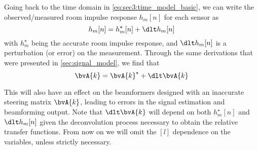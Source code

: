 %	
%	
Going back to the time domain in \cref{eq:sec3:time_model_basic}, we can write the observed/measured room impulse response $h_m[n]$ for each sensor as
\begin{equation}
	h_m[n] = h_m^\star[n] + \dlt h_m[n]
\end{equation}
with $h_m^\star$ being the accurate room impulse response, and $\dlt h_m[n]$ is a perturbation (or error) on the measurement. Through the same derivations that were presented in \cref{sec:signal_model}, we find that
\begin{equation}
	\bvA{k} = \bvA{k}^\star + \dlt \bvA{k}
\end{equation}

This will also have an effect on the beamformers designed with an inaccurate steering matrix $\bvA{k}$, leading to errors in the signal estimation and beamforming output. Note that $\dlt\bvA{k}$ will depend on both $h_m^\star[n]$ and $\dlt h_m[n]$ given the deconvolution process necessary to obtain the relative transfer functions. From now on we will omit the $[l]$ dependence on the variables, unless strictly necessary.

